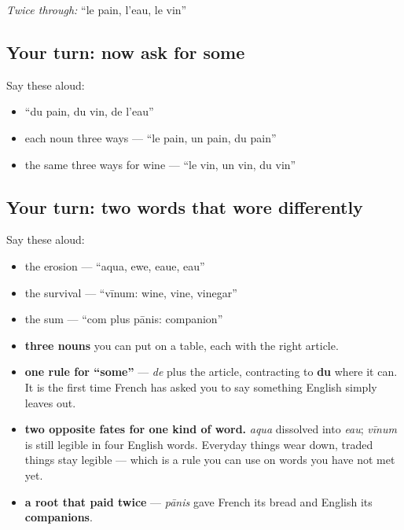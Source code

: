 \emph{Twice through:} \textquotedblleft{}le pain, l'eau, le vin\textquotedblright{}

\subsection*{Your turn: now ask for some}
Say these aloud:

\begin{itemize}
\raggedright
  \item \textquotedblleft{}du pain, du vin, de l'eau\textquotedblright{}
  \item each noun three ways — \textquotedblleft{}le pain, un pain, du pain\textquotedblright{}
  \item the same three ways for wine — \textquotedblleft{}le vin, un vin, du vin\textquotedblright{}
\end{itemize}

\subsection*{Your turn: two words that wore differently}
Say these aloud:

\begin{itemize}
\raggedright
  \item the erosion — \textquotedblleft{}aqua, ewe, eaue, eau\textquotedblright{}
  \item the survival — \textquotedblleft{}vīnum: wine, vine, vinegar\textquotedblright{}
  \item the sum — \textquotedblleft{}com plus pānis: companion\textquotedblright{}
\end{itemize}

\begin{grammarlens}[title={What you've built this chapter}]
\begin{itemize}
\raggedright
  \item \textbf{three nouns} you can put on a table, each with the right article.
  \item \textbf{one rule for \textquotedblleft{}some\textquotedblright{}} — \emph{de} plus the article, contracting to \textbf{du} where it can. It is the first time French has asked you to say something English simply leaves out.
  \item \textbf{two opposite fates for one kind of word.} \emph{aqua} dissolved into \emph{eau}; \emph{vīnum} is still legible in four English words. Everyday things wear down, traded things stay legible — which is a rule you can use on words you have not met yet.
  \item \textbf{a root that paid twice} — \emph{pānis} gave French its bread and English its \textbf{companions}.
\end{itemize}
\end{grammarlens}

